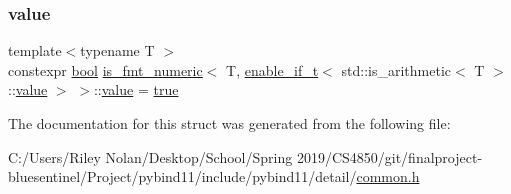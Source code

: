 \subsubsection{\texorpdfstring{value}{value}}
{\footnotesize\ttfamily template$<$typename T $>$ \\
constexpr \mbox{\hyperlink{asdl_8h_af6a258d8f3ee5206d682d799316314b1}{bool}} \mbox{\hyperlink{structis__fmt__numeric}{is\+\_\+fmt\+\_\+numeric}}$<$ T, \mbox{\hyperlink{detail_2common_8h_a012819c9e8b5e04872a271f50f8b8196}{enable\+\_\+if\+\_\+t}}$<$ std\+::is\+\_\+arithmetic$<$ T $>$\+::\mbox{\hyperlink{_s_d_l__opengl__glext_8h_a8ad81492d410ff2ac11f754f4042150f}{value}} $>$ $>$\+::\mbox{\hyperlink{_s_d_l__opengl__glext_8h_a8ad81492d410ff2ac11f754f4042150f}{value}} = \mbox{\hyperlink{asdl_8h_af6a258d8f3ee5206d682d799316314b1a08f175a5505a10b9ed657defeb050e4b}{true}}\hspace{0.3cm}{\ttfamily [static]}}



The documentation for this struct was generated from the following file\+:\begin{DoxyCompactItemize}
\item 
C\+:/\+Users/\+Riley Nolan/\+Desktop/\+School/\+Spring 2019/\+C\+S4850/git/finalproject-\/bluesentinel/\+Project/pybind11/include/pybind11/detail/\mbox{\hyperlink{detail_2common_8h}{common.\+h}}\end{DoxyCompactItemize}

